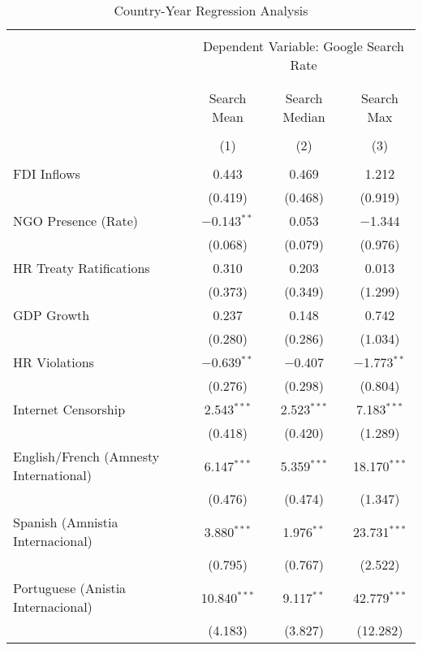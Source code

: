 
\begin{table}[!htbp] \centering 
  \caption{Country-Year Regression Analysis} 
  \label{} 
\begin{tabular}{@{\extracolsep{5pt}}lccc} 
\\[-1.8ex]\hline 
\hline \\[-1.8ex] 
 & \multicolumn{3}{c}{Dependent Variable: Google Search Rate} \\ 
\cline{2-4} 
\\[-1.8ex] & \multicolumn{3}{c}{ } \\ 
 & Search Mean & Search Median & Search Max \\ 
\\[-1.8ex] & (1) & (2) & (3)\\ 
\hline \\[-1.8ex] 
 FDI Inflows & 0.443 & 0.469 & 1.212 \\ 
  & (0.419) & (0.468) & (0.919) \\ 
  NGO Presence (Rate) & $-$0.143$^{**}$ & 0.053 & $-$1.344 \\ 
  & (0.068) & (0.079) & (0.976) \\ 
  HR Treaty Ratifications & 0.310 & 0.203 & 0.013 \\ 
  & (0.373) & (0.349) & (1.299) \\ 
  GDP Growth & 0.237 & 0.148 & 0.742 \\ 
  & (0.280) & (0.286) & (1.034) \\ 
  HR Violations & $-$0.639$^{**}$ & $-$0.407 & $-$1.773$^{**}$ \\ 
  & (0.276) & (0.298) & (0.804) \\ 
  Internet Censorship & 2.543$^{***}$ & 2.523$^{***}$ & 7.183$^{***}$ \\ 
  & (0.418) & (0.420) & (1.289) \\ 
  English/French (Amnesty International) & 6.147$^{***}$ & 5.359$^{***}$ & 18.170$^{***}$ \\ 
  & (0.476) & (0.474) & (1.347) \\ 
  Spanish (Amnistia Internacional) & 3.880$^{***}$ & 1.976$^{**}$ & 23.731$^{***}$ \\ 
  & (0.795) & (0.767) & (2.522) \\ 
  Portuguese (Anistia Internacional) & 10.840$^{***}$ & 9.117$^{**}$ & 42.779$^{***}$ \\ 
  & (4.183) & (3.827) & (12.282) \\ 

\end{tabular}
\end{table}
